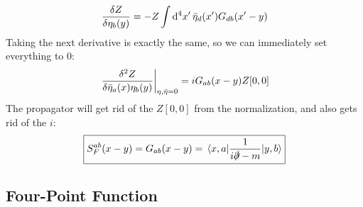 \documentclass[12pt]{article}
\newcommand{\D}{\partial}
\newcommand{\etab}{\bar{\eta}}
\begin{document}
\begin{align*}
  \fdv{Z}{\eta_b(y)}=-Z\int\dd[4]{x'}
  \etab_d(x')G_{db}(x'-y)
\end{align*}
Taking the next derivative is exactly the same, so we can immediately set everything to $0$:
\begin{align*}
  \eval{\frac{\delta^2Z}{\delta\etab_a(x)\eta_b(y)}}_{\eta,\etab=0}=
  iG_{ab}(x-y)Z[0,0]
\end{align*}
The propagator will get rid of the $Z[0,0]$ from the normalization, and also gets rid of the $i$:
\begin{align*}
  \boxed{S^{ab}_F(x-y)=G_{ab}(x-y)=\mel{x,a}{\frac{1}{i\slashed{\D}-m}}{y,b}}
\end{align*}
\subsection{Four-Point Function}
\end{document}
